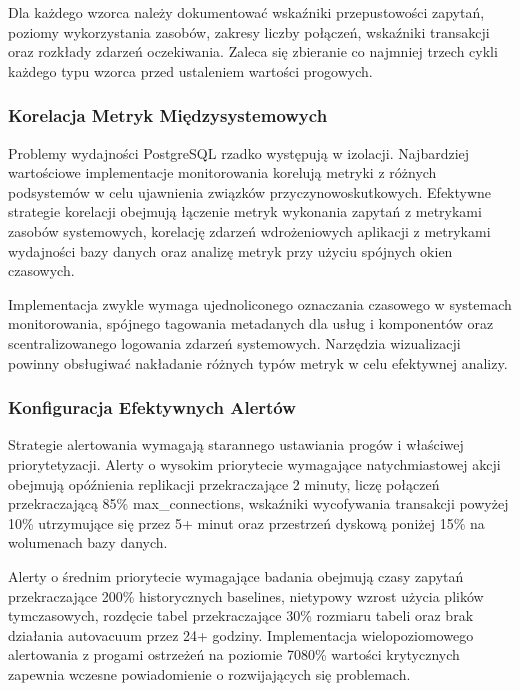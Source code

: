 \documentclass[letterpaper,10pt,polish]{sphinxmanual}
\begin{document}
\sphinxAtStartPar
Dla każdego wzorca należy dokumentować wskaźniki przepustowości zapytań, poziomy wykorzystania zasobów, zakresy liczby połączeń, wskaźniki transakcji oraz rozkłady zdarzeń oczekiwania. Zaleca się zbieranie co najmniej trzech cykli każdego typu wzorca przed ustaleniem wartości progowych.


\subsubsection{Korelacja Metryk Międzysystemowych}
\label{\detokenize{rozdzial2/repo-wspolne/index:korelacja-metryk-miedzysystemowych}}
\sphinxAtStartPar
Problemy wydajności PostgreSQL rzadko występują w izolacji. Najbardziej wartościowe implementacje monitorowania korelują metryki z różnych podsystemów w celu ujawnienia związków przyczynowo\sphinxhyphen{}skutkowych. Efektywne strategie korelacji obejmują łączenie metryk wykonania zapytań z metrykami zasobów systemowych, korelację zdarzeń wdrożeniowych aplikacji z metrykami wydajności bazy danych oraz analizę metryk przy użyciu spójnych okien czasowych.

\sphinxAtStartPar
Implementacja zwykle wymaga ujednoliconego oznaczania czasowego w systemach monitorowania, spójnego tagowania metadanych dla usług i komponentów oraz scentralizowanego logowania zdarzeń systemowych. Narzędzia wizualizacji powinny obsługiwać nakładanie różnych typów metryk w celu efektywnej analizy.


\subsubsection{Konfiguracja Efektywnych Alertów}
\label{\detokenize{rozdzial2/repo-wspolne/index:konfiguracja-efektywnych-alertow}}
\sphinxAtStartPar
Strategie alertowania wymagają starannego ustawiania progów i właściwej priorytetyzacji. Alerty o wysokim priorytecie wymagające natychmiastowej akcji obejmują opóźnienia replikacji przekraczające 2 minuty, liczę połączeń przekraczającą 85\% max\_connections, wskaźniki wycofywania transakcji powyżej 10\% utrzymujące się przez 5+ minut oraz przestrzeń dyskową poniżej 15\% na wolumenach bazy danych.

\sphinxAtStartPar
Alerty o średnim priorytecie wymagające badania obejmują czasy zapytań przekraczające 200\% historycznych baselines, nietypowy wzrost użycia plików tymczasowych, rozdęcie tabel przekraczające 30\% rozmiaru tabeli oraz brak działania autovacuum przez 24+ godziny. Implementacja wielopoziomowego alertowania z progami ostrzeżeń na poziomie 70\sphinxhyphen{}80\% wartości krytycznych zapewnia wczesne powiadomienie o rozwijających się problemach.
\end{document}
